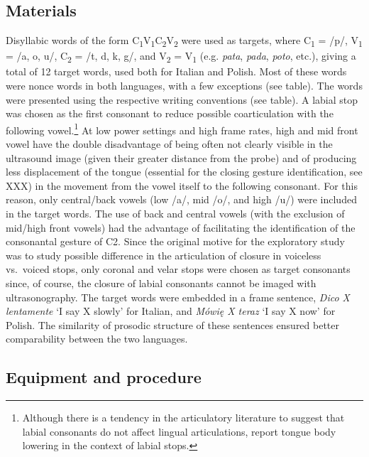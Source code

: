 \documentclass[]{JASAnew}
\begin{document}
\hypertarget{materials}{%
\subsection{Materials}\label{materials}}

Disyllabic words of the form
C\textsubscript{1}V\textsubscript{1}C\textsubscript{2}V\textsubscript{2}
were used as targets, where C\textsubscript{1} = /p/, V\textsubscript{1}
= /a, o, u/, C\textsubscript{2} = /t, d, k, g/, and V\textsubscript{2} =
V\textsubscript{1} (e.g. \emph{pata}, \emph{pada}, \emph{poto}, etc.),
giving a total of 12 target words, used both for Italian and Polish.
Most of these words were nonce words in both languages, with a few
exceptions (see table). The words were presented using the respective
writing conventions (see table). A labial stop was chosen as the first
consonant to reduce possible coarticulation with the following
vowel.\footnote{Although there is a tendency in the articulatory literature to suggest that labial consonants do not affect lingual articulations, \citealt{vazquez-alvarez2007} report tongue body lowering in the context of labial stops.}
At low power settings and high frame rates, high and mid front vowel
have the double disadvantage of being often not clearly visible in the
ultrasound image (given their greater distance from the probe) and of
producing less displacement of the tongue (essential for the closing
gesture identification, see XXX) in the movement from the vowel itself
to the following consonant. For this reason, only central/back vowels
(low /a/, mid /o/, and high /u/) were included in the target words. The
use of back and central vowels (with the exclusion of mid/high front
vowels) had the advantage of facilitating the identification of the
consonantal gesture of C2. Since the original motive for the exploratory
study was to study possible difference in the articulation of closure in
voiceless vs.~voiced stops, only coronal and velar stops were chosen as
target consonants since, of course, the closure of labial consonants
cannot be imaged with ultrasonography. The target words were embedded in
a frame sentence, \emph{Dico X lentamente} `I say X slowly' for Italian,
and \emph{Mówię X teraz} `I say X now' for Polish. The similarity of
prosodic structure of these sentences ensured better comparability
between the two languages.

\hypertarget{equipment-and-procedure}{%
\subsection{Equipment and procedure}\label{equipment-and-procedure}}
\end{document}
